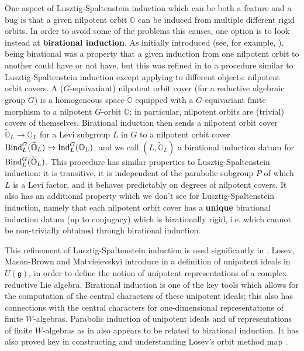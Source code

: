 \documentclass[11pt]{amsart}
\renewcommand{\O}{{\mathbb O}}
\newcommand{\g}{{\mathfrak g}}
\newcommand{\Ind}{{{\mbox{\rm Ind}}}}
\newcommand{\BInd}{{{\mbox{\rm Bind}}}}
\newcommand{\covO}{\widetilde{\O}}
\numberwithin{equation}{section}
\begin{document}
	One aspect of Lusztig-Spaltenstein induction which can be both a feature and a bug is that a given nilpotent orbit $\O$ can be induced from multiple different rigid orbits. In order to avoid some of the problems this causes, one option is to look instead at {\bf birational induction}. As initially introduced (see, for example, \cite{LoOM}), being birational was a property that a given induction from one nilpotent orbit to another could have or not have, but this was refined in \cite{LMM} to a procedure similar to Lusztig-Spaltenstein induction except applying to different objects: nilpotent orbit covers. A ($G$-equivariant) nilpotent orbit cover (for a reductive algebraic group $G$) is a homogeneous space $\covO$ equipped with a $G$-equivariant finite morphism to a nilpotent $G$-orbit $\O$; in particular, nilpotent orbits are (trivial) covers of themselves. Birational induction then sends a nilpotent orbit cover $\covO_L\to\O_L$ for a Levi subgroup $L$ in $G$ to a nilpotent orbit cover $\BInd_L^G(\covO_L)\to \Ind_L^G(\O_L)$, and we call $(L,\covO_L)$ a birational induction datum for $\BInd_L^G(\covO_L)$. This procedure has similar properties to Lusztig-Spaltenstein induction: it is transitive, it is independent of the parabolic subgroup $P$ of which $L$ is a Levi factor, and it behaves predictably on degrees of nilpotent covers. It also has an additional property which we don't see for Lusztig-Spaltenstein induction, namely that each nilpotent orbit cover has a {\bf unique} birational induction datum (up to conjugacy) which is birationally rigid, i.e. which cannot be non-trivially obtained through birational induction.
	
	This refinement of Lusztig-Spaltenstein induction is used significantly in \cite{LMM,MM}. Losev, Mason-Brown and Matvieievskyi introduce in \cite{LMM} a definition of unipotent ideals in $U(\g)$, in order to define the notion of unipotent representations of a complex reductive Lie algebra. Birational induction is one of the key tools which allows for the computation of the central characters of these unipotent ideals; this also has connections with the central characters for one-dimensional representations of finite $W$-algebras. Parabolic induction of unipotent ideals and of representations of finite $W$-algebras as in \cite{LoPI} also appears to be related to birational induction. It has also proved key in constructing and understanding Losev's orbit method map \cite{LoOM}.
	
\end{document}

